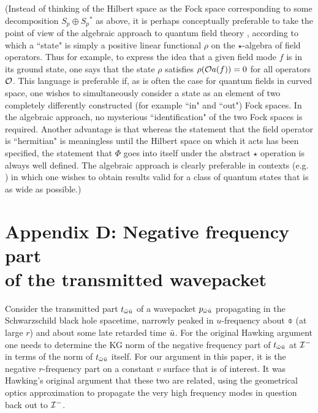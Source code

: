 (Instead of thinking of the Hilbert space as the Fock space
corresponding to some decomposition $S_p\oplus S_p{}^*$ as
above, it is perhaps conceptually preferable to take the
point of view of the algebraic approach to quantum field
theory \cite{KayWald}, according to which a ``state" is
simply a positive
linear functional $\rho$ on the $\star$-algebra of field
operators. Thus for example, to express the idea that a
given field mode $f$ is in its ground state, one says that
the state $\rho$ satisfies $\rho({\cal O} a(f))=0$ for all
operators ${\cal O}$. This language is preferable if, as is
often the case for quantum fields in curved space, one
wishes to simultaneously consider a state as an element of
two completely differently constructed (for example ``in" and
``out") Fock spaces. In the
algebraic approach, no mysterious ``identification" of the
two Fock spaces is required. Another advantage is that
whereas the statement that the field operator is ``hermitian" is
meaningless until the Hilbert space on which it acts has
been specified, the statement that $\Phi$ goes into itself
under the abstract $\star$ operation is always well defined.
The algebraic approach is clearly preferable in
contexts (e.g. \cite{KayWald,WaldYurt}) in which one wishes to
obtain results valid for a class of quantum states that is
as wide as possible.)

\section*{Appendix D: Negative frequency part \\
of the transmitted wavepacket}

Consider the transmitted part $t_{\bar{\omega}\bar{u}}$ of a
wavepacket $p_{\bar{\omega}\bar{u}}$ propagating in the
Schwarzschild black hole spacetime, narrowly peaked in
$u$-frequency about $\obar$ (at large $r$)
and about some late retarded
time $\bar{u}$. For the original Hawking argument one needs to
determine the KG norm of the negative frequency part of
$t_{\bar{\omega}\bar{u}}$ at ${\cal I}^-$ in terms of the norm of
$t_{\bar{\omega}\bar{u}}$ itself. For our argument in this paper,
it is the negative $r$-frequency part on a constant $v$ surface
that is of interest. It was Hawking's original argument that
these two are related, using the geometrical optics
approximation to propagate the very high frequency modes in
question back out to ${\cal I}^-$.

